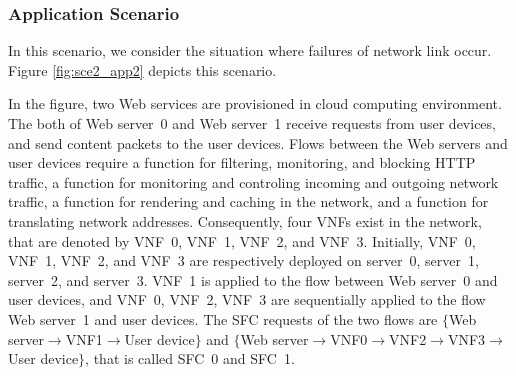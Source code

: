 \documentclass[technicalreport]{ieicej}
\begin{document}
	\subsubsection{Application Scenario}
	In this scenario, we consider the situation where failures of network link occur.
	Figure \ref{fig:sce2_app2} depicts this scenario.
	\begin{figure*}[!t]
		\begin{center}
			\caption{Scenario2: Route changes and VNF migrations on network failures}
			\label{fig:sce2_app2}
		\end{center}
	\end{figure*}
	In the figure, two Web services are provisioned in cloud computing environment.
	The both of Web server~0 and Web server~1 receive requests from user devices, and send content packets to the user devices.
	Flows between the Web servers and user devices require a function for filtering, monitoring, and blocking HTTP traffic, a function for monitoring and controling incoming and outgoing network traffic, a function for rendering and caching in the network, and a function for translating network addresses.
	Consequently, four VNFs exist in the network, that are denoted by VNF~0, VNF~1, VNF~2, and VNF~3.
	Initially, VNF~0, VNF~1, VNF~2, and VNF~3 are respectively deployed on server~0, server~1, server~2, and server~3.
	VNF~1 is applied to the flow between Web server~0 and user devices, and VNF~0, VNF~2, VNF~3 are sequentially applied to the flow Web server~1 and user devices.
	The SFC requests of the two flows are $\{$Web server$\rightarrow$VNF1$\rightarrow$User device$\}$ and $\{$Web server$\rightarrow$VNF0$\rightarrow$VNF2$\rightarrow$VNF3$\rightarrow$User device$\}$, that is called SFC~0 and SFC~1.
\end{document}

